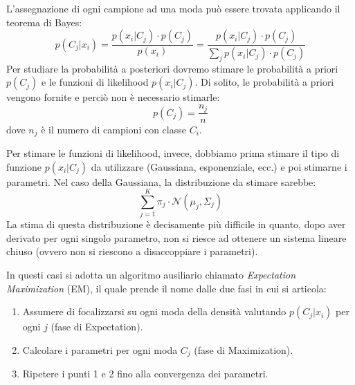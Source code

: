 \documentclass[a4paper,oneside,titlepage]{book}
\begin{document}
\noindent
L'assegnazione di ogni campione ad una moda può essere trovata applicando il teorema di Bayes:
\[ p(C_j|x_i) = \frac{p(x_i|C_j) \cdot p(C_j)}{p(x_i)} = \frac{p(x_i|C_j) \cdot p(C_j)}{\sum_j p(x_i|C_j) \cdot p(C_j)} \]
Per studiare la probabilità a posteriori dovremo stimare le probabilità a priori $p(C_j)$ e le funzioni di likelihood $p(x_i|C_j)$. Di solito, le probabilità a priori vengono fornite e perciò non è necessario stimarle:
\[ p(C_j) = \frac{n_j}{n} \]
dove $n_j$ è il numero di campioni con classe $C_i$.

Per stimare le funzioni di likelihood, invece, dobbiamo prima stimare il tipo di funzione $p(x_i|C_j)$ da utilizzare (Gaussiana, esponenziale, ecc.) e poi stimarne i parametri. Nel caso della Gaussiana, la distribuzione da stimare sarebbe:
\[ \sum_{j=1}^K \pi_j \cdot \mathcal{N}(\mu_j, \Sigma_j) \]
La stima di questa distribuzione è decisamente più difficile in quanto, dopo aver derivato per ogni singolo parametro, non si riesce ad ottenere un sistema lineare chiuso (ovvero non si riescono a disaccoppiare i parametri).

In questi casi si adotta un algoritmo ausiliario chiamato \textit{Expectation Maximization} (EM), il quale prende il nome dalle due fasi in cui si articola:
\begin{enumerate}
    \item Assumere di focalizzarsi su ogni moda della densità valutando $p(C_j|x_i)$ per ogni $j$ (fase di Expectation).
    \item Calcolare i parametri per ogni moda $C_j$ (fase di Maximization).
    \item Ripetere i punti 1 e 2 fino alla convergenza dei parametri.
\end{enumerate}
\end{document}
